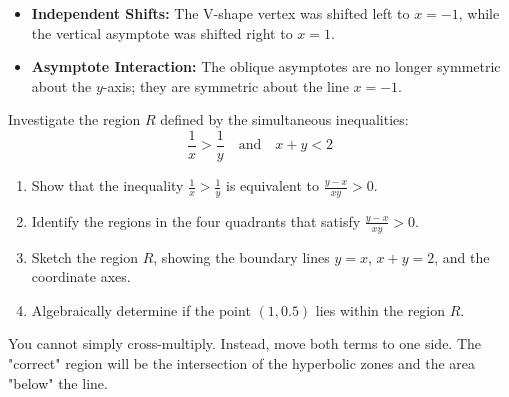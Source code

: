 \begin{takeaways}
\begin{itemize}[leftmargin=*]
\item \textbf{Independent Shifts:} The V-shape vertex was shifted left to $x = -1$, while the vertical asymptote was shifted right to $x = 1$.
\item \textbf{Asymptote Interaction:} The oblique asymptotes are no longer symmetric about the $y$-axis; they are symmetric about the line $x = -1$.
\end{itemize}
\end{takeaways}

\begin{problem}
Investigate the region $R$ defined by the simultaneous inequalities:
\[ \frac{1}{x} > \frac{1}{y} \quad \text{and} \quad x + y < 2 \]
\begin{enumerate}[label=(\roman*)]
\item Show that the inequality $\frac{1}{x} > \frac{1}{y}$ is equivalent to $\frac{y - x}{xy} > 0$.
\item Identify the regions in the four quadrants that satisfy $\frac{y - x}{xy} > 0$.
\item Sketch the region $R$, showing the boundary lines $y = x$, $x + y = 2$, and the coordinate axes.
\item Algebraically determine if the point $(1, 0.5)$ lies within the region $R$.
\end{enumerate}

\begin{center}
\end{center}
\end{problem}

\begin{hint}
You cannot simply cross-multiply. Instead, move both terms to one side. The "correct" region will be the intersection of the hyperbolic zones and the area "below" the line.
\end{hint}

